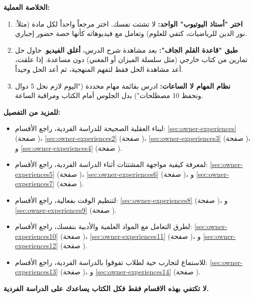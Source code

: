 \documentclass[12pt,a4paper]{book}
\newcommand{\importantAr}[1]{%
	\begin{important}
		\bfseries #1
	\end{important}
}
\begin{document}
	\textbf{الخلاصة العملية:}
	\begin{enumerate}
		\item \textbf{اختر "أستاذ اليوتيوب" الواحد:} لا تشتت نفسك. اختر مرجعاً واحداً لكل مادة (مثلاً: نور الدين للرياضيات، كتفي للعلوم) وتعامل مع فيديوهاته كأنها حصة حضور إجباري.
		\item \textbf{طبق "قاعدة القلم الجاف":} بعد مشاهدة شرح الدرس، \textbf{أغلق الفيديو}. حاول حل تمارين من كتاب خارجي (مثل سلسلة الميزان أو المغني) دون مساعدة. إذا علقت، أعد مشاهدة الحل فقط لتفهم المنهجية، ثم أعد الحل وحيداً.
		\item \textbf{نظام المهام لا الساعات:} ادرس بقائمة مهام محددة ("اليوم لازم نحل 5 دوال ونحفظ 10 مصطلحات") بدل الجلوس أمام الكتاب ومراقبة الساعة.
	\end{enumerate}
	
	\textbf{للمزيد من التفصيل:}
	\begin{itemize}
		\item لبناء العقلية الصحيحة للدراسة الفردية، راجع الأقسام: \ref{sec:owner-experiences} (صفحة \pageref{sec:owner-experiences})، \ref{sec:owner-experiences2} (صفحة \pageref{sec:owner-experiences2})، \ref{sec:owner-experiences3} (صفحة \pageref{sec:owner-experiences3})، و \ref{sec:owner-experiences4} (صفحة \pageref{sec:owner-experiences4}).
		\item لمعرفة كيفية مواجهة المشتتات أثناء الدراسة الفردية، راجع الأقسام: \ref{sec:owner-experiences5} (صفحة \pageref{sec:owner-experiences5})، \ref{sec:owner-experiences6} (صفحة \pageref{sec:owner-experiences6})، و \ref{sec:owner-experiences7} (صفحة \pageref{sec:owner-experiences7}).
		\item لتنظيم الوقت بفعالية، راجع الأقسام: \ref{sec:owner-experiences8} (صفحة \pageref{sec:owner-experiences8})، و \ref{sec:owner-experiences9} (صفحة \pageref{sec:owner-experiences9}).
		\item لطرق التعامل مع المواد العلمية والأدبية بنفسك، راجع الأقسام: \ref{sec:owner-experiences10} (صفحة \pageref{sec:owner-experiences10})، \ref{sec:owner-experiences11} (صفحة \pageref{sec:owner-experiences11})، و \ref{sec:owner-experiences12} (صفحة \pageref{sec:owner-experiences12}).
		\item للاستماع لتجارب حية لطلاب تفوقوا بالدراسة الفردية، راجع الأقسام: \ref{sec:owner-experiences13} (صفحة \pageref{sec:owner-experiences13})، و \ref{sec:owner-experiences14} (صفحة \pageref{sec:owner-experiences14}).
	\end{itemize}
	
	\importantAr{لا تكتفي بهذه الاقسام فقط فكل الكتاب يساعدك على الدراسة الفردية.}
	
\end{document}
